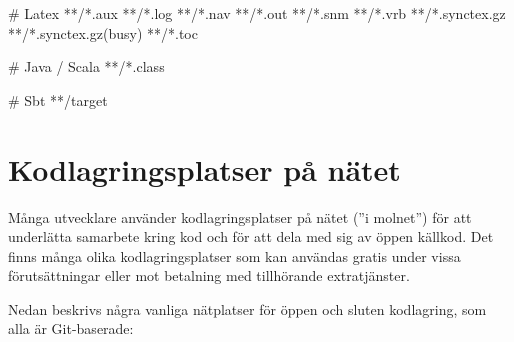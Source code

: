 \begin{itemize}[leftmargin=*]
\begin{Code}[language=]
# Latex
**/*.aux
**/*.log
**/*.nav
**/*.out
**/*.snm
**/*.vrb
**/*.synctex.gz
**/*.synctex.gz(busy)
**/*.toc

# Java / Scala
**/*.class

# Sbt
**/target

\end{Code} 


\end{itemize}
 

\clearpage 
  
\section{Kodlagringsplatser på nätet}

Många utvecklare använder kodlagringsplatser på nätet (''i molnet'') för att underlätta samarbete kring kod och för att dela med sig av öppen källkod. Det finns många olika kodlagringsplatser som kan användas gratis under vissa förutsättningar eller mot betalning med tillhörande extratjänster. 

Nedan beskrivs några vanliga nätplatser för öppen och sluten kodlagring, som alla är Git-baserade:

